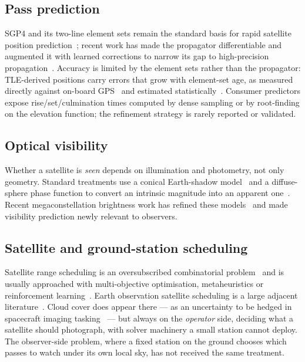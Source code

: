 \documentclass[conference]{IEEEtran}
\begin{document}
\subsection{Pass prediction}
SGP4 and its two-line element sets remain the standard basis for rapid
satellite position prediction~\cite{vallado2022fundamentals,
acciarini2025sgp4}; recent work has made the propagator differentiable and
augmented it with learned corrections to narrow its gap to high-precision
propagation~\cite{acciarini2025sgp4}. Accuracy is limited by the element sets
rather than the propagator: TLE-derived positions carry errors that grow with
element-set age, as measured directly against on-board
GPS~\cite{kovar2022tle} and estimated statistically~\cite{curzi2021tle}. Consumer predictors expose
rise/set/culmination times computed by dense sampling or by root-finding on the
elevation function; the refinement strategy is rarely reported or validated.

\subsection{Optical visibility}
Whether a satellite is \emph{seen} depends on illumination and photometry, not
only geometry. Standard treatments use a conical Earth-shadow
model~\cite{vallado2022fundamentals} and a diffuse-sphere phase function to
convert an intrinsic magnitude into an apparent
one~\cite{fankhauser2023brightness}. Recent megaconstellation brightness work
has refined these models~\cite{fankhauser2023brightness,
mallama2021starlink, lawler2022visibility} and made visibility prediction newly
relevant to observers.

\subsection{Satellite and ground-station scheduling}
Satellite range scheduling is an oversubscribed combinatorial
problem~\cite{li2023srsp} and is usually approached with multi-objective
optimisation, metaheuristics or reinforcement
learning~\cite{petelin2021ground, song2023cluster, ou2023drl,
wang2024avns}. Earth observation satellite scheduling is a large adjacent
literature~\cite{wang2021agile, eddy2021mis}. Cloud cover does appear there
--- as an uncertainty to be hedged in spacecraft imaging
tasking~\cite{wang2020robust, wang2021robust} --- but always on the
\emph{operator} side, deciding what a satellite should photograph, with
solver machinery a small station cannot deploy. The observer-side problem, where
a fixed station on the ground chooses which passes to watch under its own local
sky, has not received the same treatment.
\end{document}

